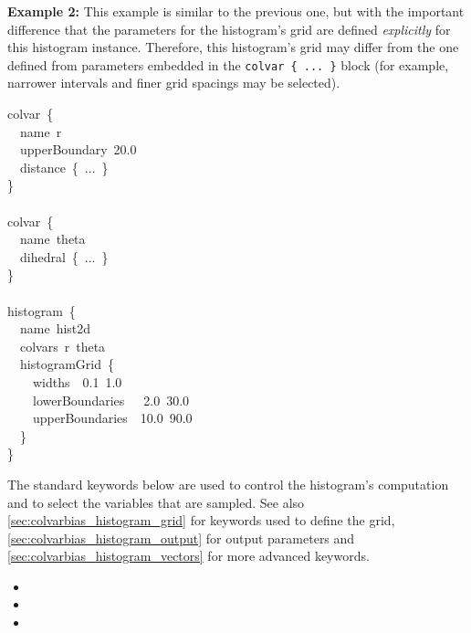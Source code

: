 \noindent\textbf{Example 2:} This example is similar to the previous one, but with the important difference that the parameters for the histogram's grid are defined \emph{explicitly} for this histogram instance.  Therefore, this histogram's grid may differ from the one defined from parameters embedded in the \texttt{colvar~\{~...~\}} block (for example, narrower intervals and finer grid spacings may be selected).
\begin{cvexampleinput}
\-colvar~\{\\
\-\-~~name~r\\
\-\-~~upperBoundary~20.0\\
\-\-~~distance~\{~...~\}\\
\-\}\\
\\
\-colvar~\{\\
\-\-~~name~theta\\
\-\-~~dihedral~\{~...~\}\\
\-\}\\
\\
\-histogram~\{\\
\-\-~~name~hist2d\\
\-\-~~colvars~r~theta\\
\-\-~~histogramGrid~\{\\
\-\-~~~~widths~~0.1~1.0\\
\-\-~~~~lowerBoundaries~~~2.0~30.0\\
\-\-~~~~upperBoundaries~~10.0~90.0\\
\-\-~~\}\\
\-\}\\
\end{cvexampleinput}


The standard keywords below are used to control the histogram's computation and to select the variables that are sampled.  See also \ref{sec:colvarbias_histogram_grid} for keywords used to define the grid, \ref{sec:colvarbias_histogram_output} for output parameters and \ref{sec:colvarbias_histogram_vectors} for more advanced keywords.

\begin{itemize}

\item {}
\item {}
\item {}

\end{itemize}


